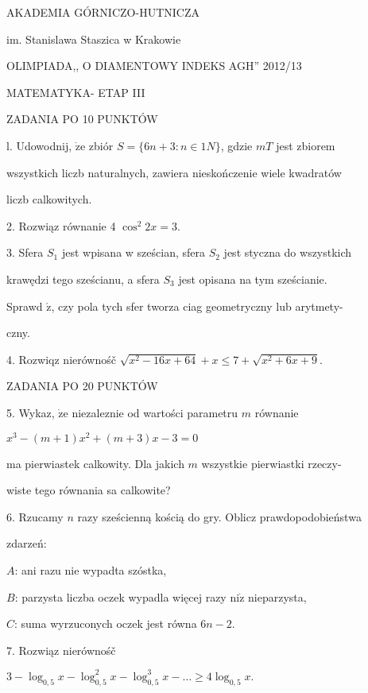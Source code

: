 \documentclass[a4paper,12pt]{article}
\begin{document}
AKADEMIA GÓRNICZO-HUTNICZA

im. Stanislawa Staszica w Krakowie

OLIMPIADA,, O DIAMENTOWY INDEKS AGH'' 2012/13

MATEMATYKA- ETAP III

ZADANIA PO 10 PUNKTÓW

l. Udowodnij, $\dot{\mathrm{z}}\mathrm{e}$ zbiór $S= \{6n+3:n\in 1N\}$, gdzie $mT$ jest zbiorem

wszystkich liczb naturalnych, zawiera nieskończenie wiele kwadratów

liczb calkowitych.

2. Rozwiąz równanie 4 $\cos^{2}2x=3.$

3. Sfera $S_{1}$ jest wpisana w sześcian, sfera $S_{2}$ jest styczna do wszystkich

krawędzi tego sześcianu, a sfera $S_{3}$ jest opisana na tym sześcianie.

Sprawd $\acute{\mathrm{z}}$, czy pola tych sfer tworza ciag geometryczny lub arytmety-

czny.

4. Rozwiqz nierównośč $\sqrt{x^{2}-16x+64}+x\leq 7+\sqrt{x^{2}+6x+9}.$

ZADANIA PO 20 PUNKTÓW

5. Wykaz, $\dot{\mathrm{z}}\mathrm{e}$ niezaleznie od wartości parametru $m$ równanie

$x^{3}-(m+1)x^{2}+(m+3)x-3=0$

ma pierwiastek calkowity. Dla jakich $m$ wszystkie pierwiastki rzeczy-

wiste tego równania sa calkowite?

6. Rzucamy $n$ razy sześcienną kością do gry. Oblicz prawdopodobieństwa

zdarzeń:

$A$: ani razu nie wypadta szóstka,

$B$: parzysta liczba oczek wypadla więcej razy $\mathrm{n}\mathrm{i}\dot{\mathrm{z}}$ nieparzysta,

$C$: suma wyrzuconych oczek jest równa $6n-2.$

7. Rozwiąz nierównośč

$3-\log_{0,5}x-\log_{0,5}^{2}x-\log_{0,5}^{3}x-\ldots\geq 4\log_{0,5}x.$
\end{document}
